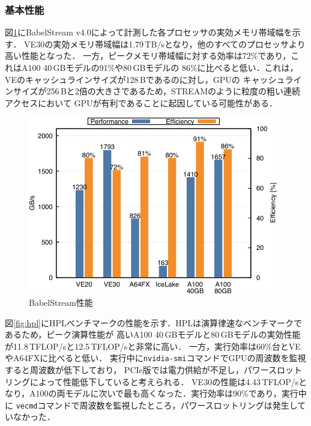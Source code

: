 ﻿\documentclass[submit,techrep,noauthor]{ipsj}
\begin{document}
\subsubsection{基本性能}

図\ref{fig:stream}にBabelStream v4.0によって計測した各プロセッサの実効メモリ帯域幅を示す．
VE30の実効メモリ帯域幅は1.79\,TB/sとなり，他のすべてのプロセッサより高い性能となった．
一方，ピークメモリ帯域幅に対する効率は72\%であり，これはA100 40\,GBモデルの91\%や80\,GBモデルの
86\%に比べると低い．これは，VEのキャッシュラインサイズが128\,Bであるのに対し，GPUの
キャッシュラインサイズが256\,Bと2倍の大きさであるため，STREAMのように粒度の粗い連続アクセスにおいて
GPUが有利であることに起因している可能性がある．

\begin{figure}
  \centering
  \includegraphics{figs/stream.pdf}
  \caption{BabelStream性能~\cite{Takahashi2023}}\label{fig:stream}
\end{figure}

図\ref{fig:hpl}にHPLベンチマークの性能を示す．HPLは演算律速なベンチマークであるため，ピーク演算性能が
高いA100 40\,GBモデルと80\,GBモデルの実効性能が11.8\,TFLOP/sと12.5\,TFLOP/sと非常に高い．
一方，実行効率は60\%台とVEやA64FXに比べると低い．
実行中に\verb|nvidia-smi|コマンドでGPUの周波数を監視すると周波数が低下しており，
PCIe版では電力供給が不足し，パワースロットリングによって性能低下していると考えられる．
VE30の性能は4.43\,TFLOP/sとなり，A100の両モデルに次いで最も高くなった．実行効率は90\%であり，実行中に
\verb|vecmd|コマンドで周波数を監視したところ，パワースロットリングは発生していなかった．
\end{document}
